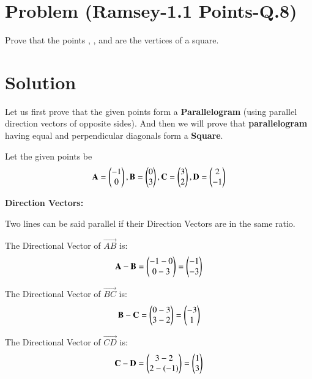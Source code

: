 \documentclass[journal,12pt,twocolumn]{IEEEtran}
\begin{document}
\section*{\textbf{Problem (Ramsey-1.1 Points-Q.8)}}
Prove that the points , ,  and  are the vertices of a square.
\section*{Solution}
Let us first prove that the given points form a \textbf{Parallelogram} (using parallel direction vectors of opposite sides). And then we will prove that \textbf{parallelogram} having equal and perpendicular diagonals form a \textbf{Square}.

Let the given points be
\begin{equation}
\mathbf{A} = \begin{pmatrix}-1\\0\end{pmatrix}, \mathbf{B} = \begin{pmatrix}0\\3\end{pmatrix}, \mathbf{C} = \begin{pmatrix}3\\2\end{pmatrix}, \mathbf{D} = \begin{pmatrix}2\\-1\end{pmatrix}
\end{equation}

\textbf{Direction Vectors:}

Two lines can be said parallel if their Direction Vectors are in the same ratio.

The Directional Vector of $\vec{AB}$ is:
\begin{equation}
    \mathbf{A} - \mathbf{B} = \begin{pmatrix}-1-0\\0-3\end{pmatrix} = \begin{pmatrix}-1\\-3\end{pmatrix}
    \label{AB}
\end{equation}

The Directional Vector of $\vec{BC}$ is:
\begin{equation}
    \mathbf{B} - \mathbf{C} = \begin{pmatrix}0-3\\3-2\end{pmatrix} = \begin{pmatrix}-3\\1\end{pmatrix}
    \label{BC}
\end{equation}

The Directional Vector of $\vec{CD}$ is:
\begin{equation}
    \mathbf{C} - \mathbf{D} = \begin{pmatrix}3-2\\2-(-1)\end{pmatrix} = \begin{pmatrix}1\\3\end{pmatrix}
    \label{CD}
\end{equation}
\end{document}
